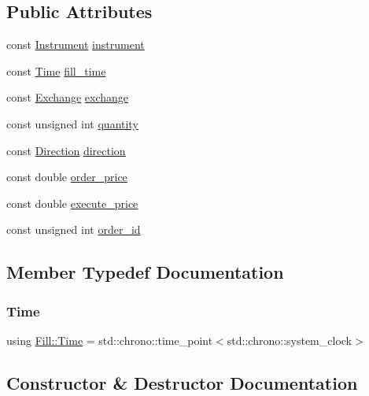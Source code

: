 \subsection*{Public Attributes}
\begin{DoxyCompactItemize}
\item 
const \hyperlink{classInstrument}{Instrument} \hyperlink{classFill_ad8cc2217100d31b29c61554adfae4c89}{instrument}
\item 
const \hyperlink{classFill_ab2f91079415160baf6bae4ce4e651882}{Time} \hyperlink{classFill_a3c16af5c63d428b20e145bdd8aed079c}{fill\+\_\+time}
\item 
const \hyperlink{fill_8h_a0735734beae0a6b094ce815e727eeca0}{Exchange} \hyperlink{classFill_affe8391a70b7231659a2c54d38c449ee}{exchange}
\item 
const unsigned int \hyperlink{classFill_a6a19e54b16e7025f2196e6658acf8976}{quantity}
\item 
const \hyperlink{fill_8h_a224b9163917ac32fc95a60d8c1eec3aa}{Direction} \hyperlink{classFill_ab2451992abc07d5a0a217225bea39d3b}{direction}
\item 
const double \hyperlink{classFill_ac7415e2ba0339c0060d13b4900971f25}{order\+\_\+price}
\item 
const double \hyperlink{classFill_aee5774c287161b4b453d688fd75d24af}{execute\+\_\+price}
\item 
const unsigned int \hyperlink{classFill_afd7bfe98f2df0ae03a662083b0526ad1}{order\+\_\+id}
\end{DoxyCompactItemize}


\subsection{Member Typedef Documentation}
\mbox{\label{classFill_ab2f91079415160baf6bae4ce4e651882}} 
\subsubsection{\texorpdfstring{Time}{Time}}
{\footnotesize\ttfamily using \hyperlink{classFill_ab2f91079415160baf6bae4ce4e651882}{Fill\+::\+Time} =  std\+::chrono\+::time\+\_\+point$<$std\+::chrono\+::system\+\_\+clock$>$}



\subsection{Constructor \& Destructor Documentation}
\mbox{\label{classFill_ac7abcfc5d69d92624d820ac2c54b26a9}} 
